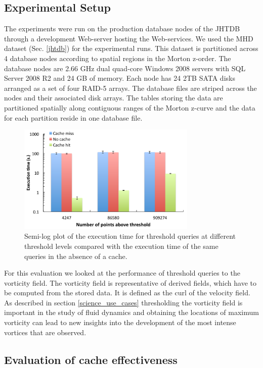 \documentclass{sig-alternate}
\newcommand{\kk}[1]{{\color{blue}{\it KK: #1}}}
\begin{document}
\subsection{Experimental Setup}
The experiments were run on the production database nodes of the JHTDB through a development Web-server hosting the Web-services. We used
the MHD dataset (Sec. \ref{jhtdb}) for the experimental runs. This dataset is partitioned across 4 database nodes according to spatial regions in the
Morton z-order. 
The database nodes are 2.66 GHz dual quad-core Windows 2008 servers with SQL Server 2008 R2 and 24 GB of memory. Each node has 24 2TB 
SATA disks arranged as a set of four RAID-5 arrays. The database files are striped across the nodes and their associated disk
arrays. The tables storing the data are partitioned spatially along contiguous ranges of the Morton z-curve and the data for each partition reside in one
database file. 

\begin{figure}
\centering
\includegraphics[width=3.35in]{Figures/cache_overhead.pdf}
\caption{Semi-log plot of the execution time for threshold queries at different threshold levels compared with the execution time of the same queries in the
absence of a cache.}
\label{fig:cache_overhead}
\end{figure}

For this evaluation we looked at the performance of threshold queries to the vorticity field. The vorticity field is representative of derived fields, which
have to be computed from the stored data. It is defined as the curl of the velocity field.
As described in section \ref{science_use_cases}
thresholding the vorticity field is important in the study of fluid dynamics and obtaining the locations of maximum vorticity can lead to new insights into
the development of the most intense vortices that are observed. 

\subsection{Evaluation of cache effectiveness}
\end{document}
